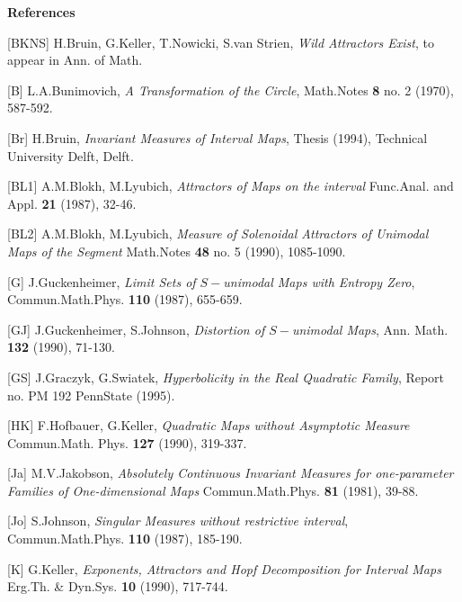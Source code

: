 \bigskip
\centerline{\bf References}
\bigskip

\parindent=25pt
\item{[BKNS]} H.Bruin, G.Keller, T.Nowicki, S.van Strien, {\it Wild
            Attractors Exist}, to appear in Ann. of Math.

\item{[B]} L.A.Bunimovich, {\it A Transformation of the Circle},
           Math.Notes {\bf 8} no. 2 (1970), 587-592.

\item{[Br]} H.Bruin, {\it Invariant Measures of Interval Maps},
            Thesis (1994), Technical University Delft, Delft.

\item{[BL1]} A.M.Blokh, M.Lyubich, {\it Attractors of Maps on the interval}
            Func.Anal. and Appl. {\bf 21} (1987), 32-46.

\item{[BL2]} A.M.Blokh, M.Lyubich, {\it Measure of Solenoidal Attractors
            of Unimodal Maps of the Segment} Math.Notes {\bf 48} no. 5 (1990),
            1085-1090.

\item{[G]} J.Guckenheimer, {\it Limit Sets of $S-$unimodal Maps with
            Entropy Zero}, Commun.Math.Phys. {\bf 110} (1987), 655-659.

\item{[GJ]} J.Guckenheimer, S.Johnson, {\it Distortion of $S-$unimodal Maps},
            Ann. Math. {\bf 132} (1990), 71-130. 

\item{[GS]} J.Graczyk, G.Swiatek, {\it Hyperbolicity in the Real
            Quadratic Family}, Report no. PM 192 PennState (1995).

\item{[HK]} F.Hofbauer, G.Keller, {\it Quadratic Maps without Asymptotic
            Measure} Commun.Math. Phys. {\bf 127} (1990), 319-337.

\item{[Ja]} M.V.Jakobson, {\it Absolutely Continuous Invariant Measures 
           for one-parameter Families of One-dimensional Maps} 
           Commun.Math.Phys. {\bf 81} (1981), 39-88.

\item{[Jo]} S.Johnson, {\it Singular Measures without restrictive interval},
           Commun.Math.Phys. {\bf 110} (1987), 185-190.

\item{[K]} G.Keller, {\it Exponents, Attractors and Hopf Decomposition
            for Interval Maps} Erg.Th. \& Dyn.Sys. {\bf 10} (1990), 717-744. 

